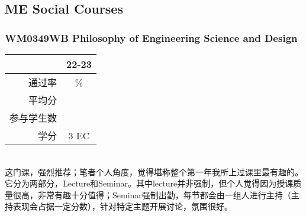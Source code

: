\vspace{\betsubsec} %
\subsection{ME Social Courses}
\subsubsection[WM0349WB Philosophy of Engineering Science and Design]{WM0349WB Philosophy of Engineering Science and Design}
\begin{minipage}{0.45\textwidth}
\centering
{}
\end{minipage}%
\begin{minipage}{0.45\textwidth}
\raggedleft
\begin{tabular}{r|c}
\textbf{ } & \textbf{22-23} \\ \hline
通过率 & \% \\ 
平均分 &  \\ 
参与学生数 &  \\
学分 & 3 EC\\
\end{tabular}
\end{minipage}\\

这门课，强烈推荐；笔者个人角度，觉得堪称整个第一年我所上过课里最有趣的。它分为两部分，Lecture和Seminar。其中lecture并非强制，但个人觉得因为授课质量很高，非常有趣十分值得；Seminar强制出勤，每节都会由一组人进行主持（主持表现会占据一定分数），针对特定主题开展讨论，氛围很好。

